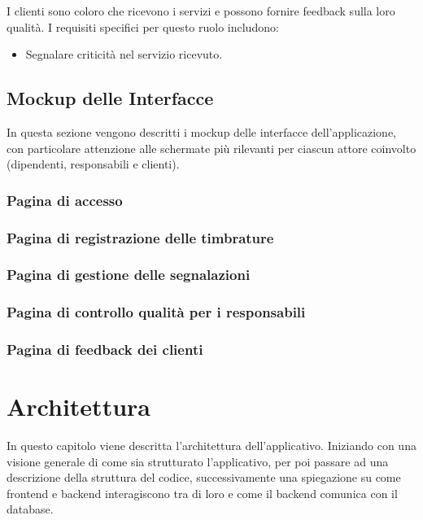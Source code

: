 \documentclass[twoside]{supsistudent}
\begin{document}
I clienti sono coloro che ricevono i servizi e possono fornire feedback sulla loro qualità. I requisiti specifici per questo ruolo includono:

\begin{itemize}
  \item Segnalare criticità nel servizio ricevuto.
\end{itemize}


\section{Mockup delle Interfacce}

In questa sezione vengono descritti i mockup delle interfacce dell’applicazione, con particolare attenzione alle schermate più rilevanti per ciascun attore coinvolto (dipendenti, responsabili e clienti).

\subsection{Pagina di accesso}
\subsection{Pagina di registrazione delle timbrature}
\subsection{Pagina di gestione delle segnalazioni}
\subsection{Pagina di controllo qualità per i responsabili}
\subsection{Pagina di feedback dei clienti}



\chapter{Architettura}

In questo capitolo viene descritta l’architettura dell’applicativo. Iniziando con una visione generale di come sia strutturato l’applicativo, per poi passare ad una descrizione della struttura del codice, successivamente una spiegazione su come frontend e backend interagiscono tra di loro e come il backend comunica con il database.
\end{document}
